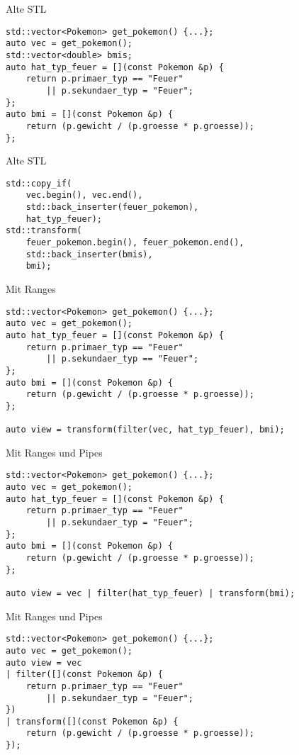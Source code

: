 \begin{frame}[fragile]{Alte STL}
    \begin{verbatim}
std::vector<Pokemon> get_pokemon() {...};
auto vec = get_pokemon();
std::vector<double> bmis;
auto hat_typ_feuer = [](const Pokemon &p) {
    return p.primaer_typ == "Feuer"
        || p.sekundaer_typ = "Feuer";
};
auto bmi = [](const Pokemon &p) {
    return (p.gewicht / (p.groesse * p.groesse));
};

    \end{verbatim}
\end{frame}

\begin{frame}[fragile]{Alte STL}
    \begin{verbatim}
std::copy_if(
    vec.begin(), vec.end(),
    std::back_inserter(feuer_pokemon),
    hat_typ_feuer);
std::transform(
    feuer_pokemon.begin(), feuer_pokemon.end(),
    std::back_inserter(bmis),
    bmi);
    \end{verbatim}
\end{frame}

\begin{frame}[fragile]{Mit Ranges}
    \begin{verbatim}
std::vector<Pokemon> get_pokemon() {...};
auto vec = get_pokemon();
auto hat_typ_feuer = [](const Pokemon &p) {
    return p.primaer_typ == "Feuer"
        || p.sekundaer_typ == "Feuer";
};
auto bmi = [](const Pokemon &p) {
    return (p.gewicht / (p.groesse * p.groesse));
};

auto view = transform(filter(vec, hat_typ_feuer), bmi);

\end{verbatim}
\end{frame}

\begin{frame}[fragile]{Mit Ranges und Pipes}
    \begin{verbatim}
std::vector<Pokemon> get_pokemon() {...};
auto vec = get_pokemon();
auto hat_typ_feuer = [](const Pokemon &p) {
    return p.primaer_typ == "Feuer"
        || p.sekundaer_typ = "Feuer";
};
auto bmi = [](const Pokemon &p) {
    return (p.gewicht / (p.groesse * p.groesse));
};

auto view = vec | filter(hat_typ_feuer) | transform(bmi);

    \end{verbatim}
\end{frame}

\begin{frame}[fragile]{Mit Ranges und Pipes}
    \begin{verbatim}
std::vector<Pokemon> get_pokemon() {...};
auto vec = get_pokemon();
auto view = vec
| filter([](const Pokemon &p) {
    return p.primaer_typ == "Feuer"
        || p.sekundaer_typ = "Feuer";
})
| transform([](const Pokemon &p) {
    return (p.gewicht / (p.groesse * p.groesse));
});
    \end{verbatim}
\end{frame}


